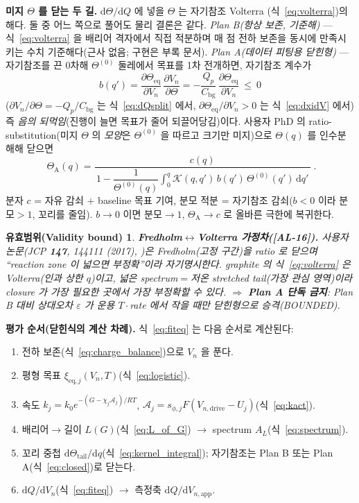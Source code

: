 \documentclass[11pt,a4paper]{article}
\newtheorem*{boundbox}{유효범위(Validity bound)}
\newcommand{\dd}{\mathrm{d}}
\newcommand{\eq}{\mathrm{eq}}
\newcommand{\app}{\mathrm{app}}
\newcommand{\drive}{\mathrm{drive}}
\newcommand{\bg}{\mathrm{bg}}
\newcommand{\AL}[1]{\textsf{[AL-#1]}}
\begin{document}
\textbf{미지 $\Theta$ 를 닫는 두 길.} $\dd\Theta/\dd Q$ 에 넣을 $\Theta$ 는 자기참조 Volterra
(식~\eqref{eq:volterra})의 해다. 둘 중 어느 쪽으로 풀어도 물리 결론은 같다.
\emph{Plan B(항상 보존, 기준해)} — 식~\eqref{eq:volterra} 을 배리어 격자에서 직접 적분하며 매 점 전하 보존을
동시에 만족시키는 수치 기준해다(근사 없음; 구현은 부록 문서). \emph{Plan A(데이터 피팅용 닫힌형)} — 자기참조를
끈 0차해 $\Theta^{(0)}$ 둘레에서 목표를 1차 전개하면, 자기참조 계수가
\begin{equation}
b(q')=\frac{\partial\Theta_\eq}{\partial V_n}\,\frac{\partial V_n}{\partial\Theta}
=-\frac{Q_p}{C_\bg}\,\frac{\partial\Theta_\eq}{\partial V_n}\ \le\ 0
\label{eq:selfcoupling}
\end{equation}
($\partial V_n/\partial\Theta=-Q_p/C_\bg$ 는 식~\eqref{eq:dQsplit} 에서, $\partial\Theta_\eq/\partial V_n>0$ 는
식~\eqref{eq:dxidV} 에서) 즉 \emph{음의 되먹임}(진행이 늘면 목표가 줄어 되끌어당김)이다. 사용자 PhD 의
ratio-substitution(미지 $\Theta$ 의 \emph{모양}은 $\Theta^{(0)}$ 을 따르고 크기만 미지)으로 $\Theta(q)$ 를
인수분해해 닫으면
\begin{equation}
\boxed{\;\Theta_\mathrm A(q)=\frac{c(q)}{\,1-\dfrac{1}{\Theta^{(0)}(q)}\displaystyle\int_0^q\mathcal K(q,q')\,b(q')\,\Theta^{(0)}(q')\,\dd q'\,}\;.}
\label{eq:closed}
\end{equation}
분자 $c$ = 자유 감쇠 + baseline 목표 기여, 분모 적분 = 자기참조 감쇠($b<0$ 이라 분모$>1$, 꼬리를 줄임).
$b\to0$ 이면 분모$\to1$, $\Theta_\mathrm A\to c$ 로 올바른 극한에 복귀한다.
\begin{boundbox}
\textbf{Fredholm$\leftrightarrow$Volterra 가정차(\AL{16}).} 사용자 논문(\emph{JCP} \textbf{147}, 144111 (2017),
\cite{jcp2017})은 \emph{Fredholm}(고정 구간)을 ratio 로 닫으며 ``reaction zone 이 넓으면 부정확''이라 자기명시한다.
graphite 의 식~\eqref{eq:volterra} 은 \emph{Volterra}(인과 상한 $q$)이고, 넓은 spectrum$=$저온 stretched tail(가장
관심 영역)이라 closure 가 가장 필요한 곳에서 가장 부정확할 수 있다. $\Rightarrow$ \textbf{Plan A 단독 금지}: Plan B 대비
상대오차 $\varepsilon$ 가 운용 $T\cdot$rate 에서 작을 때만 닫힌형으로 승격(BOUNDED).
\end{boundbox}

\textbf{평가 순서(닫힌식의 계산 차례).} 식~\eqref{eq:fiteq} 는 다음 순서로 계산된다:
\begin{enumerate}[label=\textbf{S\arabic*.},leftmargin=2.6em,itemsep=1pt]
\item 전하 보존(식~\eqref{eq:charge_balance})으로 $V_n$ 을 푼다.
\item 평형 목표 $\xi_{\eq,j}(V_n,T)$(식~\eqref{eq:logistic}).
\item 속도 $k_j=k_0 e^{-(G-\chi_j\mathcal A_j)/RT}$, $\mathcal A_j=s_{\phi,j}F(V_{n,\drive}-U_j)$(식~\eqref{eq:kact}).
\item 배리어$\to$길이 $L(G)$(식~\eqref{eq:L_of_G}) $\to$ spectrum $A_L$(식~\eqref{eq:spectrum}).
\item 꼬리 중첩 $\dd\Theta_\mathrm{tail}/\dd q$(식~\eqref{eq:kernel_integral}); 자기참조는 Plan B 또는 Plan A(식~\eqref{eq:closed})로 닫는다.
\item $\dd Q/\dd V_n$(식~\eqref{eq:fiteq}) $\to$ 측정축 $\dd Q/\dd V_{n,\app}$.
\end{enumerate}
\end{document}
